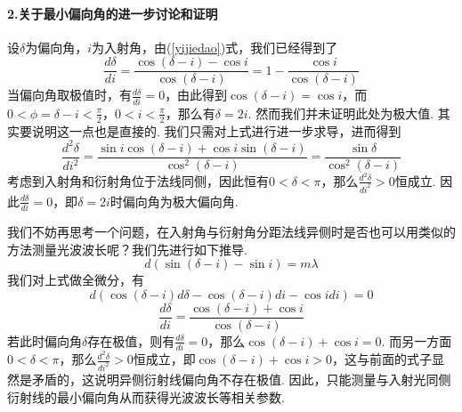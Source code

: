 \documentclass[UTF8]{ctexart}
\begin{document}
\paragraph{2.\quad 关于最小偏向角的进一步讨论和证明}\quad\par
设$\delta$为偏向角，$i$为入射角，由(\ref{yijiedao})式，我们已经得到了
\[\frac{d\delta}{di}=\frac{\cos(\delta-i)-\cos i}{\cos(\delta-i)}=1-\frac{\cos i}{\cos(\delta-i)}\]
当偏向角取极值时，有$\displaystyle{\frac{d\delta}{di}=0}$，由此得到$\cos(\delta-i)=\cos i$，而$\displaystyle{0<\phi=\delta-i<\frac{\pi}{2}}$，$\displaystyle{0<i<\frac{\pi}{2}}$，那么有$\delta=2i$. 然而我们并未证明此处为极大值. 其实要说明这一点也是直接的. 我们只需对上式进行进一步求导，进而得到
\[\frac{d^2\delta}{di^2}=\frac{\sin i\cos(\delta-i)+\cos i\sin(\delta-i)}{\cos^2(\delta-i)}=\frac{\sin\delta}{\cos^2(\delta-i)}\]
考虑到入射角和衍射角位于法线同侧，因此恒有$0<\delta<\pi$，那么$\displaystyle{\frac{d^2\delta}{di^2}}>0$恒成立. 因此$\displaystyle{\frac{d\delta}{di}=0}$，即$\delta=2i$时偏向角为极大偏向角.\par
我们不妨再思考一个问题，在入射角与衍射角分距法线异侧时是否也可以用类似的方法测量光波波长呢？我们先进行如下推导.
\begin{equation}
    d(\sin(\delta-i)-\sin i)=m\lambda
\end{equation}
我们对上式做全微分，有
\begin{equation}
    d(\cos(\delta-i)d\delta-\cos(\delta-i)di-\cos idi)=0
\end{equation}
\begin{equation}
    \frac{d\delta}{di}=\frac{\cos(\delta-i)+\cos i}{\cos(\delta-i)}
\end{equation}
若此时偏向角$\delta$存在极值，则有$\displaystyle{\frac{d\delta}{di}=0}$，那么$\cos(\delta-i)+\cos i=0$. 而另一方面$0<\delta<\pi$，那么$\displaystyle{\frac{d^2\delta}{di^2}}>0$恒成立，即$\cos(\delta-i)+\cos i>0$，这与前面的式子显然是矛盾的，这说明异侧衍射线偏向角不存在极值. 因此，只能测量与入射光同侧衍射线的最小偏向角从而获得光波波长等相关参数.
\end{document}
